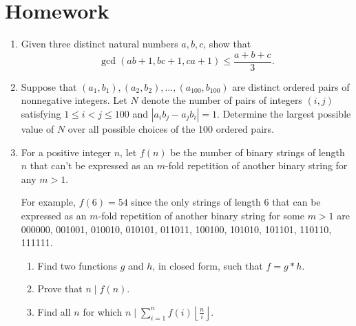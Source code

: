 \documentclass{article}
\begin{document}
\section{Homework}
\begin{enumerate}
  \item Given three distinct natural numbers $a,b,c$, show that
    \[\gcd(ab+1,bc+1,ca+1)\le\frac{a+b+c}3.\]
  \item Suppose that $(a_1,b_1),(a_2,b_2),\ldots,(a_{100},b_{100})$ are distinct
    ordered pairs of nonnegative integers.
    Let $N$ denote the number of pairs of integers $(i,j)$ satisfying
    $1\leq i<j\leq 100$ and $|a_i b_j-a_j b_i|=1$. 
    Determine the largest possible value of $N$ over all possible choices of the
    100 ordered pairs.
  \item For a positive integer $n$, let $f(n)$ be the number of binary strings of length $n$ that
      can't be expressed as an $m$-fold repetition of another binary string for
      any $m>1$.

      For example, $f(6)=54$ since the only strings of length 6 that can be
      expressed as an $m$-fold repetition of another binary string for some $m>1$
      are 000000, 001001, 010010, 010101, 011011, 100100, 101010, 101101, 110110,
      111111.
       
      \begin{enumerate}
        \item Find two functions $g$ and $h$, in closed form, such that $f=g*h$.
        \item 
          Prove that $n\mid f(n)$.
        \item Find all $n$ for which $n\mid\displaystyle\sum_{i=1}^n f(i)\left\lfloor\frac
              ni\right\rfloor$.
      \end{enumerate}
\end{enumerate}
\end{document}
